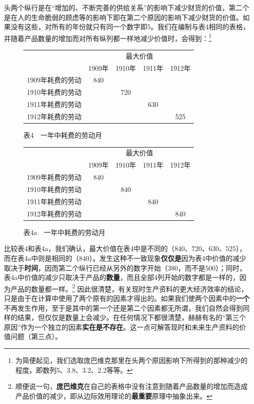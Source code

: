 \documentclass[fontset=fandol, a4paper, 12pt, openright]{ctexbook}
\begin{document}
头两个纵行是在“增加的、不断完善的供给关系”的影响下减少财货的价值，第二个是在人的生命脆弱的顾虑等的影响下即在第二个原因的影响下减少财货的价值。如果没有这些，对所有的年份就只有同一个数字即5。我们在编制与表4相同的表格，并随着产品数量的增加而对所有纵列都一样地减少价值时，会得到：\footnote{为简便起见，我们选取庞巴维克那里在头两个原因影响下所得到的那种减少的程度，即数列5、3.8、3.2、2.2等等。}

\begin{figure}[htbp]
    \centering
    \begin{tabular}{c | c c c c}
        \hline
        & \multicolumn{4}{c}{最大价值} \\
        & 1909年 & 1910年 & 1911年 & 1912年 \\
        \hline
        1909年耗费的劳动 & 840 & & & \\
        1910年耗费的劳动 & & 720 & & \\
        1911年耗费的劳动 & & & 630 & \\
        1912年耗费的劳动 & & & & 525 \\
        \hline
    \end{tabular}
    \caption{表4　一年中耗费的劳动月}
\end{figure}

\begin{figure}[htbp]
    \centering
    \begin{tabular}{c | c c c c}
        \hline
        & \multicolumn{4}{c}{最大价值} \\
        & 1909年 & 1910年 & 1911年 & 1912年 \\
        \hline
        1909年耗费的劳动 & 840 & & & \\
        1910年耗费的劳动 & & 840 & & \\
        1911年耗费的劳动 & & & 840 & \\
        1912年耗费的劳动 & & & & 840 \\
        \hline
    \end{tabular}
    \caption{表4a　一年中耗费的劳动月}
\end{figure}

比较表4和表4a，我们确认，最大价值在表4中是不同的（840、720、630、525），而在表4a中则是相同的（840）。发生这种不一致现象\textbf{仅仅是}因为表4中价值的减少取决于\textbf{时间}，因而第二个纵行已经从另外的数字开始（380，而不是500）；同时，表4a中价值的减少只取决于产品的\textbf{数量}，而且全部4列开始的数字都是一样的，因为产品的数量都一样。\footnote{顺便说一句，\textbf{庞巴维克}在自己的表格中没有注意到随着产品数量的增加而造成产品价值的减少，即从边际效用理论的\textbf{最重要}原理中抽象出来。} 因此很清楚，有关现时生产资料的更大经济效率的结论，只是由于在计算中使用了两个原有的因素才得出的。如果我们使两个因素中的\textbf{一个}不再发生作用，至于是其中的第一个还是第二个因素都无所谓，我们自然会得到同样的结果，但仅仅是数量上会减少。在任何情况下都很清楚，赫赫有名的“第三个原因”作为一个独立的因素\textbf{实在是不存在}。这一点可解答现时和未来生产资料的价值问题（第三点）。
\end{document}
